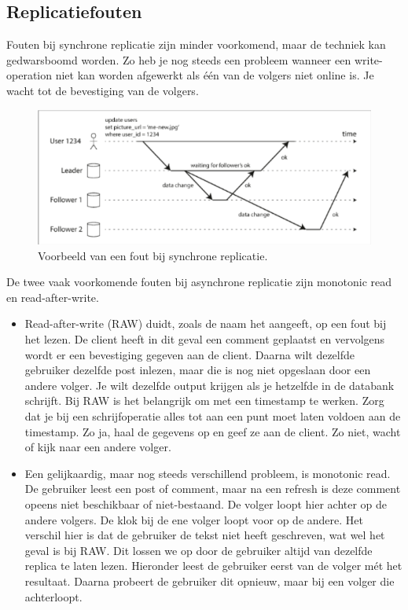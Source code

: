 \documentclass[a4paper,10pt,twoside]{report}
\begin{document}
\subsection{Replicatiefouten}

Fouten bij synchrone replicatie zijn minder voorkomend, maar de techniek kan gedwarsboomd worden. Zo heb je nog steeds een probleem wanneer een write-operation niet kan worden afgewerkt als één van de volgers niet online is. Je wacht tot de bevestiging van de volgers.

\begin{figure}
	\includegraphics[width=\linewidth]{../images/Screenshot_160.png}
	\caption{Voorbeeld van een fout bij synchrone replicatie.}
\end{figure}

De twee vaak voorkomende fouten bij asynchrone replicatie zijn monotonic read en read-after-write. 

\begin{itemize}
	\item Read-after-write (RAW) duidt, zoals de naam het aangeeft, op een fout bij het lezen. De client heeft in dit geval een comment geplaatst en vervolgens wordt er een bevestiging gegeven aan de client. Daarna wilt dezelfde gebruiker dezelfde post inlezen, maar die is nog niet opgeslaan door een andere volger. Je wilt dezelfde output krijgen als je hetzelfde in de databank schrijft. Bij RAW is het belangrijk om met een timestamp te werken. Zorg dat je bij een schrijfoperatie alles tot aan een punt moet laten voldoen aan de timestamp. Zo ja, haal de gegevens op en geef ze aan de client. Zo niet, wacht of kijk naar een andere volger.
	\item Een gelijkaardig, maar nog steeds verschillend probleem, is monotonic read. De gebruiker leest een post of comment, maar na een refresh is deze comment opeens niet beschikbaar of niet-bestaand. De volger loopt hier achter op de andere volgers. De klok bij de ene volger loopt voor op de andere. Het verschil hier is dat de gebruiker de tekst niet heeft geschreven, wat wel het geval is bij RAW. Dit lossen we op door de gebruiker altijd van dezelfde replica te laten lezen. Hieronder leest de gebruiker eerst van de volger mét het resultaat. Daarna probeert de gebruiker dit opnieuw, maar bij een volger die achterloopt.
\end{itemize}
\end{document}
